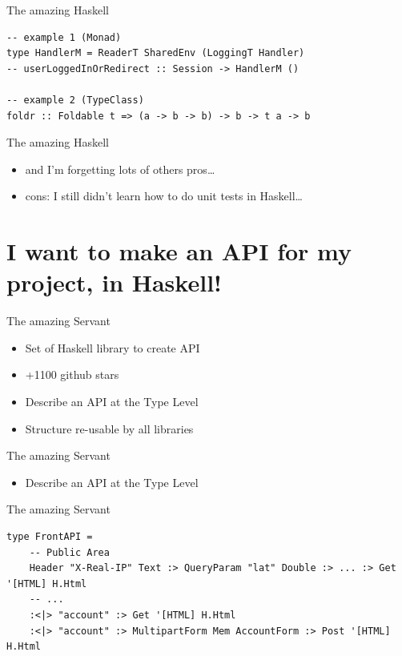 \documentclass[10pt]{beamer}
\begin{document}
\begin{frame}[fragile]{The amazing Haskell} 
\begin{verbatim}
-- example 1 (Monad)
type HandlerM = ReaderT SharedEnv (LoggingT Handler)
-- userLoggedInOrRedirect :: Session -> HandlerM ()

-- example 2 (TypeClass)
foldr :: Foldable t => (a -> b -> b) -> b -> t a -> b
\end{verbatim}
\end{frame} 

\begin{frame}{The amazing Haskell}
\begin{itemize}
\item and I'm forgetting lots of others pros…
\item cons: I still didn't learn how to do unit tests in Haskell…
\end{itemize}
\end{frame}

\section{I want to make an API for my project, in Haskell!}

\begin{frame}{The amazing Servant}
\begin{itemize}
\item Set of Haskell library to create API
\item +1100 github stars
\item Describe an API at the Type Level
\item Structure re-usable by all libraries
\end{itemize}
\end{frame}

\begin{frame}{The amazing Servant}
\begin{itemize}
\item Describe an API at the Type Level
\end{itemize}
\end{frame}

\begin{frame}[fragile]{The amazing Servant} 
\begin{verbatim}
type FrontAPI =
    -- Public Area
    Header "X-Real-IP" Text :> QueryParam "lat" Double :> ... :> Get '[HTML] H.Html
    -- ...
    :<|> "account" :> Get '[HTML] H.Html
    :<|> "account" :> MultipartForm Mem AccountForm :> Post '[HTML] H.Html
\end{verbatim}
\end{frame} 
\end{document}
